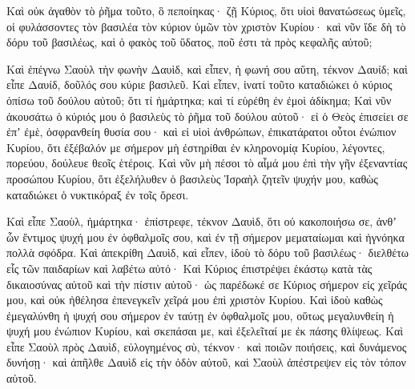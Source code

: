 {Καὶ οὐκ ἀγαθὸν τὸ ῥῆμα τοῦτο, ὃ πεποίηκας· ζῇ Κύριος, ὅτι υἱοὶ θανατώσεως ὑμεῖς, οἱ φυλάσσοντες τὸν βασιλέα τὸν κύριον ὑμῶν τὸν χριστὸν Κυρίου· καὶ νῦν ἴδε δὴ τὸ δόρυ τοῦ βασιλέως, καὶ ὁ φακὸς τοῦ ὕδατος, ποῦ ἐστι τὰ πρὸς κεφαλῆς αὐτοῦ;
\par }{\PP {}Καὶ ἐπέγνω Σαοὺλ τὴν φωνὴν Δαυὶδ, καὶ εἶπεν, ἡ φωνή σου αὕτη, τέκνον Δαυίδ; καὶ εἶπε Δαυίδ, δοῦλός σου κύριε βασιλεῦ.
Καὶ εἶπεν, ἱνατί τοῦτο καταδιώκει ὁ κύριος ὀπίσω τοῦ δούλου αὐτοῦ; ὅτι τί ἡμάρτηκα; καὶ τί εὑρέθη ἐν ἐμοὶ ἀδίκημα;
Καὶ νῦν ἀκουσάτω ὁ κύριός μου ὁ βασιλεὺς τὸ ῥῆμα τοῦ δούλου αὐτοῦ· εἰ ὁ Θεὸς ἐπισείει σε ἐπʼ ἐμὲ, ὀσφρανθείη θυσία σου· καὶ εἰ υἱοὶ ἀνθρώπων, ἐπικατάρατοι οὗτοι ἐνώπιον Κυρίου, ὅτι ἐξέβαλόν με σήμερον μὴ ἐστηρίθαι ἐν κληρονομίᾳ Κυρίου, λέγοντες, πορεύου, δούλευε θεοῖς ἑτέροις.
Καὶ νῦν μὴ πέσοι τὸ αἷμά μου ἐπὶ τὴν γῆν ἐξεναντίας προσώπου Κυρίου, ὅτι ἐξελήλυθεν ὁ βασιλεὺς Ἰσραὴλ ζητεῖν ψυχήν μου, καθὼς καταδιώκει ὁ νυκτικόραξ ἐν τοῖς ὄρεσι.
\par }{\PP {}Καὶ εἶπε Σαοὺλ, ἡμάρτηκα· ἐπίστρεφε, τέκνον Δαυὶδ, ὅτι οὐ κακοποιήσω σε, ἀνθʼ ὧν ἔντιμος ψυχή μου ἐν ὀφθαλμοῖς σου, καὶ ἐν τῇ σήμερον μεματαίωμαι καὶ ἠγνόηκα πολλὰ σφόδρα.
Καὶ ἀπεκρίθη Δαυὶδ, καὶ εἶπεν, ἰδοὺ τὸ δόρυ τοῦ βασιλέως· διελθέτω εἷς τῶν παιδαρίων καὶ λαβέτω αὐτό·
Καὶ Κύριος ἐπιστρέψει ἑκάστῳ κατὰ τὰς δικαιοσύνας αὐτοῦ καὶ τὴν πίστιν αὐτοῦ· ὡς παρέδωκέ σε Κύριος σήμερον εἰς χεῖράς μου, καὶ οὐκ ἠθέλησα ἐπενεγκεῖν χεῖρά μου ἐπὶ χριστὸν Κυρίου.
Καὶ ἰδοὺ καθὼς ἐμεγαλύνθη ἡ ψυχή σου σήμερον ἐν ταύτῃ ἐν ὀφθαλμοῖς μου, οὕτως μεγαλυνθείη ἡ ψυχή μου ἐνώπιον Κυρίου, καὶ σκεπάσαι με, καὶ ἐξελεῖταί με ἐκ πάσης θλίψεως.
Καὶ εἶπε Σαοὺλ πρὸς Δαυὶδ, εὐλογημένος σὺ, τέκνον· καὶ ποιῶν ποιήσεις, καὶ δυνάμενος δυνήσῃ· καὶ ἀπῆλθε Δαυὶδ εἰς τὴν ὁδὸν αὐτοῦ, καὶ Σαοὺλ ἀπέστρεψεν εἰς τὸν τόπον αὐτοῦ.

}
